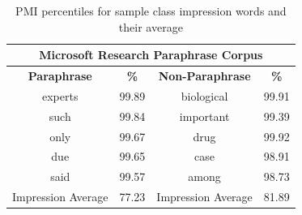 \begin{table}[]
\begin{adjustbox}{max width=\columnwidth}

\begin{tabular}{|c|c|c|c|}
\hline
\multicolumn{4}{|c|}{\textbf{Microsoft Research Paraphrase Corpus}}               \\ \hline
\textbf{Paraphrase}         & \textbf{\%} & \textbf{Non-Paraphrase} & \textbf{\%} \\ \hline
experts                     & 99.89       & biological              & 99.91       \\ \hline
{\color[HTML]{000000} such} & 99.84       & important               & 99.39       \\ \hline
only                        & 99.67       & drug                    & 99.92       \\ \hline
due                         & 99.65       & case                    & 98.91       \\ \hline
said                        & 99.57       & among                   & 98.73       \\ \hline
Impression Average          & 77.23       & Impression Average      & 81.89       \\ \hline
\end{tabular}
\end{adjustbox}
\caption{PMI percentiles for sample class impression words and their average}
\label{table:mrpc-pmi-percentile}
\end{table}


